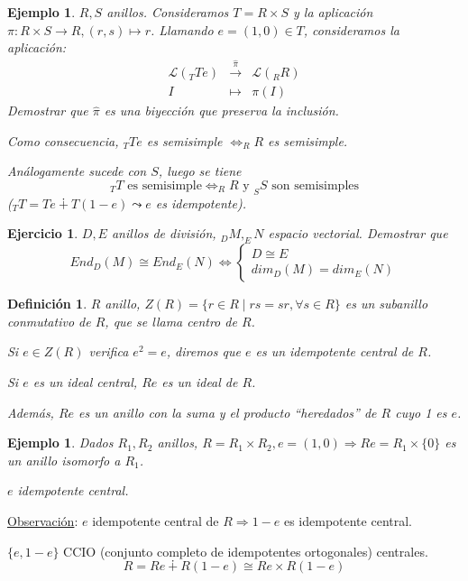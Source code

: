 \documentclass[11pt,a4paper]{article}
\theoremstyle{break}
\newtheorem{example}[theorem]{Ejemplo}
\newtheorem{definition}[theorem]{Definición}
\newtheorem{task}[theorem]{Ejercicio}
\begin{document}
\begin{example}
$R, S$ anillos. Consideramos $T = R \times S$ y la aplicación $\pi: R \times S \to R, (r, s) \mapsto r$. Llamando $e = (1, 0) \in T$, consideramos la aplicación:
$$\begin{aligned}
\mathcal{L}(_{T}Te) & \overset{\hat{\pi}}{\to} & \mathcal{L}(_{R}R) \\
I & \mapsto & \pi(I)
\end{aligned}$$
Demostrar que $\hat{\pi}$ es una biyección que preserva la inclusión.

Como consecuencia, $_{T}Te$ es semisimple $\iff _{R}R$ es semisimple.

Análogamente sucede con $S$, luego se tiene
$$_{T}T \text{ es semisimple} \iff _{R}R \text{ y } _{S}S \text{ son semisimples}$$
($_{T}T = Te \dotplus T(1-e) \leadsto e$ es idempotente).
\end{example}


\begin{task}
$D, E$ anillos de división, $_{D}M, _{E}N$ espacio vectorial. Demostrar que
$$End_{D}(M) \cong End_{E}(N) \iff \begin{cases}
D \cong E \\
dim_{D}(M) = dim_{E}(N)
\end{cases}$$
\end{task}

\begin{definition}
$R$ anillo, $Z(R) = \{r \in R \mid rs = sr, \forall s \in R\}$ es un subanillo conmutativo de $R$, que se llama centro de $R$.

Si $e \in Z(R)$ verifica $e^{2}=e$, diremos que $e$ es un idempotente central de $R$.

Si $e$ es un ideal central, $Re$ es un ideal de $R$.

Además, $Re$ es un anillo con la suma y el producto ``heredados'' de $R$ cuyo 1 es $e$.
\end{definition}

\begin{example}
Dados $R_{1}, R_{2}$ anillos, $R = R_{1} \times R_{2}, e = (1, 0) \Rightarrow Re = R_{1} \times \{0\}$ es un anillo isomorfo a $R_{1}$.

$e$ idempotente central.
\end{example}

\underline{Observación}: $e$ idempotente central de $R \Rightarrow 1 - e$ es idempotente central.

$\{e, 1-e\}$ CCIO (conjunto completo de idempotentes ortogonales) centrales.
$$R = Re \dotplus R(1-e) \cong Re \times R(1-e)$$
\end{document}
